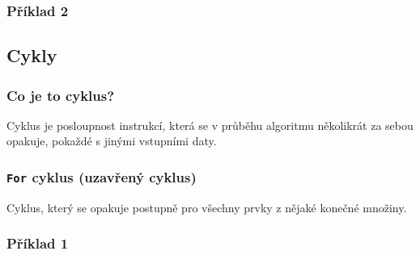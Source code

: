 \documentclass[aspectratio=169,11pt,handout]{beamer}
\begin{document}
\begin{frame}
 \frametitle{Příklad 2}
 \centering
 \begin{minipage}{.9\textwidth}
  \begin{algorithm}[H]
   \DontPrintSemicolon


  \end{algorithm}
 \end{minipage}
\end{frame}

\subsection[Cykly]{Cykly}

\begin{frame}
 \frametitle{Co je to cyklus?}
 \begin{tcolorbox}[title=Cyklus,center,width=.9\textwidth]
  Cyklus je posloupnost instrukcí, která se v průběhu algoritmu
  \alert{několikrát za sebou opakuje}, pokaždé s jinými vstupními daty.
 \end{tcolorbox}
\end{frame}

\begin{frame}
 \frametitle{\texttt{For} cyklus (uzavřený cyklus)}
 \begin{tcolorbox}[title=\texttt{For} cyklus,center,width=.9\textwidth]
  Cyklus, který se opakuje postupně pro \alert{všechny prvky z nějaké konečné
  množiny}.
 \end{tcolorbox}
\end{frame}

\begin{frame}
 \frametitle{Příklad 1}
 \centering
\end{frame}
\end{document}
